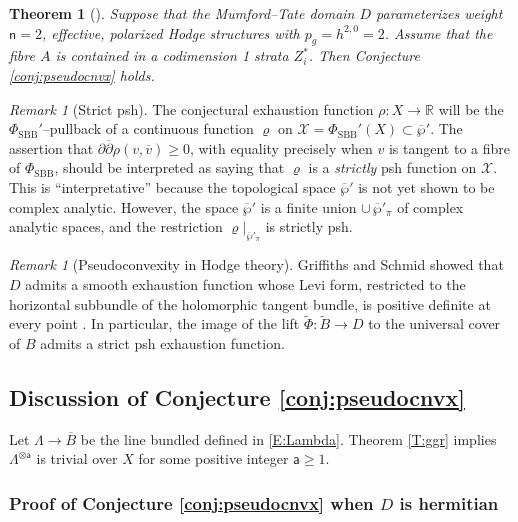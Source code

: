 \documentclass[12pt]{amsart}
\numberwithin{equation}{section}
\numberwithin{table}{section}
\def\sfa{\mathsf{a}}
\def\sfn{\mathsf{n}}
\def\bR{\mathbb{R}}
\def\sX{\mathscr{X}}
\def\ot{\otimes}
\newtheorem{theorem}[equation]{Theorem}
\theoremstyle{definition}
\theoremstyle{definition}
\theoremstyle{remark}
\newtheorem{remark}[equation]{Remark}
\def\ddb{\partial\overline{\partial}}
\def\olB{\overline B}
\def\PhiS{\Phi_\mathrm{SBB}}
\def\hPhiS{\Phi_\mathrm{SBB}'}
\def\hatP{\overline{\wp}{}'}
\begin{document}
\begin{theorem}[{\cite{Robles-pseudocnvx-eg}}]\label{T:pseudocnvx}
Suppose that the Mumford--Tate domain $D$ parameterizes weight $\sfn=2$, effective, polarized Hodge structures with $p_g = h^{2,0} = 2$.  Assume that the fibre $A$ is contained in a codimension 1 strata $Z_i^*$.  Then Conjecture \ref{conj:pseudocnvx} holds.
\end{theorem}

\begin{remark}[Strict psh] 
The conjectural exhaustion function $\rho : X \to \bR$ will be the $\hPhiS$--pullback of a continuous function $\varrho$ on $\sX = \hPhiS(X) \subset \hatP$.  The assertion that $\ddb \rho( v , \overline v) \ge 0$, with equality precisely when $v$ is tangent to a fibre of $\PhiS$, should be interpreted as saying that $\varrho$ is a \emph{strictly} psh function on $\sX$.  This is ``interpretative'' because the topological space $\hatP$ is not yet shown to be complex analytic.  However, the space $\hatP$ is a finite union $\cup\,\hatP_\pi$ of complex analytic spaces, and the restriction $\varrho\big|_{\hatP_\pi}$ is strictly psh.
\end{remark}

\begin{remark}[Pseudoconvexity in Hodge theory]
Griffiths and Schmid showed that $D$ admits a smooth exhaustion function whose Levi form, restricted to the horizontal subbundle of the holomorphic tangent bundle, is positive definite at every point \cite[(8.1)]{MR0259958}.  In particular, the image of the lift $\tilde\Phi : \tilde B \to D$ to the universal cover of $B$ admits a strict psh exhaustion function.  
\end{remark}

\subsection{Discussion of Conjecture \ref{conj:pseudocnvx}} \label{S:triv}

Let $\Lambda \to \olB$ be the line bundled defined in \eqref{E:Lambda}.  Theorem \ref{T:ggr} implies $\Lambda^{\ot \sfa}$ is trivial over $X$ for some positive integer $\sfa\ge1$.

\subsubsection{Proof of Conjecture \ref{conj:pseudocnvx} when $D$ is hermitian}
\end{document}

